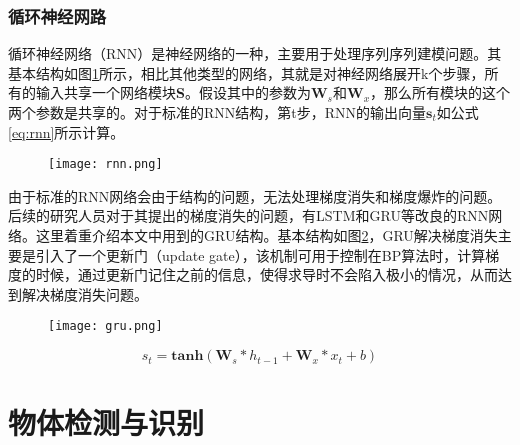 \subsubsection{循环神经网路}

循环神经网络（RNN）是神经网络的一种，主要用于处理序列序列建模问题。其基本结构如图\ref{fig:rnn}所示，相比其他类型的网络，其就是对神经网络展开k个步骤，所有的输入共享一个网络模块\textbf{S}。假设其中的参数为$\mathbf{W}_s$和$\mathbf{W}_x$，那么所有模块的这个两个参数是共享的。对于标准的RNN结构，第t步，RNN的输出向量$\mathbf{s}_t$如公式\ref{eq:rnn}所示计算。
\begin{figure}[htpb]
	\centering
	\texttt{[image: rnn.png]}
    \caption{}
	\vspace*{-3.5mm}
	\label{fig:rnn}
\end{figure}
由于标准的RNN网络会由于结构的问题，无法处理梯度消失和梯度爆炸的问题。后续的研究人员对于其提出的梯度消失的问题，有LSTM\cite{hochreiter1997long}和GRU\cite{cho2014learning}等改良的RNN网络。这里着重介绍本文中用到的GRU结构。基本结构如图\ref{fig:gru}，GRU解决梯度消失主要是引入了一个更新门（update gate），该机制可用于控制在BP算法时，计算梯度的时候，通过更新门记住之前的信息，使得求导时不会陷入极小的情况，从而达到解决梯度消失问题。
\begin{figure}[htpb]
	\centering
	\texttt{[image: gru.png]}
    \caption{}
	\vspace*{-3.5mm}
	\label{fig:gru}
\end{figure}

\begin{equation}\label{eq:rnn}
    s_t = \mathbf{tanh}(\mathbf{W}_s*h_{t-1}+\mathbf{W}_x*x_{t}+b)
\end{equation}



\section{物体检测与识别}

